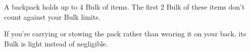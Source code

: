 

A backpack holds up to 4 Bulk of items. 
The first 2 Bulk of these items don't count against your Bulk limits. 

If you're carrying or stowing the pack rather than wearing it on your back, its Bulk is light instead of negligible.


\vfill

\ItemPrice{1sp}
\ItemBulk{-}
\hfill{}

